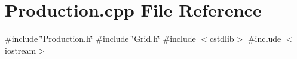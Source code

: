 \section{Production.\+cpp File Reference}
\label{Production_8cpp}
{\ttfamily \#include \char`\"{}Production.\+h\char`\"{}}\newline
{\ttfamily \#include \char`\"{}Grid.\+h\char`\"{}}\newline
{\ttfamily \#include $<$cstdlib$>$}\newline
{\ttfamily \#include $<$iostream$>$}\newline

